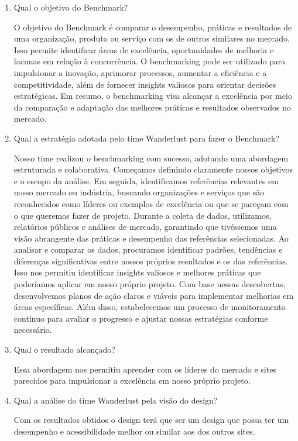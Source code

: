\documentclass{article}
\begin{document}
\begin{enumerate}
      \item Qual o objetivo do Benchmark?

            O objetivo do Benchmark é comparar o desempenho, práticas e resultados de uma organização, produto ou serviço com os de outros similares no mercado. Isso permite identificar áreas de excelência, oportunidades de melhoria e lacunas em relação à concorrência. O benchmarking pode ser utilizado para impulsionar a inovação, aprimorar processos, aumentar a eficiência e a competitividade, além de fornecer insights valiosos para orientar decisões estratégicas. Em resumo, o benchmarking visa alcançar a excelência por meio da comparação e adaptação das melhores práticas e resultados observados no mercado.

      \item Qual a estratégia adotada pelo time Wanderlust para fazer o Benchmark?

            Nosso time realizou o benchmarking com sucesso, adotando uma abordagem estruturada e colaborativa. Começamos definindo claramente nossos objetivos e o escopo da análise. Em seguida, identificamos referências relevantes em nosso mercado ou indústria, buscando organizações e serviços que são reconhecidos como líderes ou exemplos de excelência ou que se pareçam com o que queremos fazer de projeto. Durante a coleta de dados, utilizamos, relatórios públicos e análises de mercado, garantindo que tivéssemos uma visão abrangente das práticas e desempenho das referências selecionadas. Ao analisar e comparar os dados, procuramos identificar padrões, tendências e diferenças significativas entre nossos próprios resultados e os das referências. Isso nos permitiu identificar insights valiosos e melhores práticas que poderíamos aplicar em nosso próprio projeto. Com base nessas descobertas, desenvolvemos planos de ação claros e viáveis para implementar melhorias em áreas específicas. Além disso, estabelecemos um processo de monitoramento contínuo para avaliar o progresso e ajustar nossas estratégias conforme necessário.

      \item Qual o resultado alcançado?

            Essa abordagem nos permitiu aprender com os líderes do mercado e sites parecidos para impulsionar a excelência em nosso próprio projeto.

      \item Qual a análise do time Wanderlust pela visão do design?

            Com os resultados obtidos o design terá que ser um design que possa ter um desempenho e acessibilidade melhor ou similar aos dos outros sites.

\end{enumerate}
\end{document}
